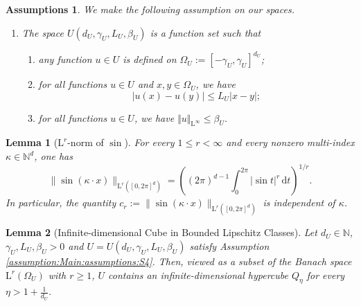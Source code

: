 \documentclass[10pt,a4paper]{amsart}
\newtheorem{assumptions}{Assumptions}
\newtheorem{lemma}{Lemma}
\def\Lp#1{\mathrm{L}^{#1}}
\newcommand{\bbN}{\mathbb{N}}
\def\dd{\mathrm{d}}
\begin{document}
\begin{assumptions} We make the following assumption on our spaces.
\begin{enumerate}[label=\textbf{S.\arabic*}]
\item The space $U(d_U,\gamma_U,L_U,\beta_U)$ is a function set such that \begin{enumerate}
    \item any function $u \in U$ is defined on $\Omega_U := [-\gamma_U,\gamma_U]^{d_U}$;
    \item for all functions $u \in U$ and $x,y \in \Omega_U$, we have \[
    \vert u(x) - u(y) \vert \leq L_U \vert x - y \vert;
    \]
    \item for all functions $u \in U$, we have $\Vert u \Vert_{\Lp{\infty}} \leq \beta_U$.
\end{enumerate}\label{assumption:Main:assumptions:S4}
\end{enumerate}
\end{assumptions}

\begin{lemma}[$\Lp{r}$-norm of $\sin$] \label{lem:sin}
For every $1 \leq r < \infty$ and every nonzero multi-index $\kappa \in \mathbb N^d$, one has
\[
\|\sin(\kappa \cdot x)\|_{\Lp{r}([0,2\pi]^d)}
=
\left((2\pi)^{d-1}\int_0^{2\pi} |\sin t|^r \,\dd t\right)^{1/r}.
\]
In particular, the quantity $c_r := \|\sin(\kappa \cdot x)\|_{\Lp{r}([0,2\pi]^d)}$ is independent of $\kappa$.
\end{lemma}

\begin{lemma}[Infinite-dimensional Cube in Bounded Lipschitz Classes]
\label{lem:boundedLipCube}
Let $d_U \in \bbN$, $\gamma_U,L_U,\beta_U > 0$ and $U = U(d_U,\gamma_U,L_U,\beta_U)$ satisfy Assumption \ref{assumption:Main:assumptions:S4}. 
Then, viewed as a subset of the Banach space $\Lp{r}(\Omega_U)$ with $r\geq 1$, 
$U$ contains an infinite-dimensional hypercube $Q_\eta$ for every
\(
\eta > 1+\frac{1}{d_U}.
\)
\end{lemma}
\end{document}
